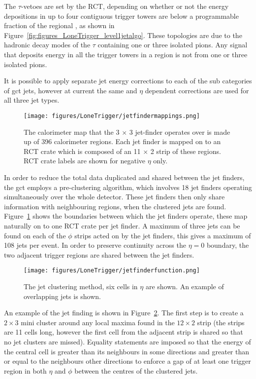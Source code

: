 The $\tau$-vetoes are set by the RCT, depending on whether or not the energy 
depositions in up to four contiguous trigger towers are below a programmable 
fraction of the regional \ET, as shown in 
Figure~\ref{fig:figures_LoneTrigger_level1jetalgo}. These topologies are due to 
the hadronic decay modes of the $\tau$ containing one or three isolated pions. 
Any signal that deposits energy in all the trigger towers in a region is not 
from one or three isolated pions.

It is possible to apply separate jet energy corrections to each of the sub 
categories of \ac{gct} jets, however at current the same \ET and $\eta$ dependent 
corrections are used for all three jet types.

\begin{figure}[ht]
  \centering    
  \texttt{[image: figures/LoneTrigger/jetfindermappings.png]}
  \caption{The calorimeter map that the 3 $\times$ 3 jet-finder operates over
   is made up of 396 calorimeter regions. Each jet finder is mapped on to an 
   RCT crate which is composed of an 11 $\times$ 2 strip of these regions. RCT
   crate labels are shown for negative $\eta$ only. }
  \label{fig:figures_LoneTrigger_jetfindermappings}
\end{figure}

In order to reduce the total data duplicated and shared between the jet finders,
the \ac{gct} employs a pre-clustering algorithm, which involves 18 jet finders 
operating simultaneously over the whole detector. These jet finders then only
share information with neighbouring regions, when the clustered jets are found.
Figure~\ref{fig:figures_LoneTrigger_jetfindermappings} shows the boundaries 
between which the jet finders operate, these map naturally on to one RCT crate 
per jet finder. A maximum of three jets can be found on each of the $\phi$ 
strips acted on by the jet finders, this gives a maximum of 108 jets per event. 
In order to preserve continuity across the $\eta = 0$ boundary, the two adjacent
trigger regions are shared between the jet finders.


\begin{figure}[ht]
  \centering
 \texttt{[image: figures/LoneTrigger/jetfinderfunction.png]}
  \caption{The \Lone jet clustering method, six cells in $\eta$ are shown. An
  example of overlapping jets is shown.\cite{ilesgct}}
  \label{fig:figures_LoneTrigger_jetfinderfunction}
\end{figure}


An example of the jet finding is shown in
Figure~\ref{fig:figures_LoneTrigger_jetfinderfunction}. The first step is to 
create a $2 \times 3$ mini cluster around any local maxima found in the $12 
\times 2$ strip (the strips are 11 cells long, however the first cell from the adjacent strip is shared so that no jet clusters are missed). Equality statements are imposed so that the energy of the 
central cell is greater than its neighbours in some directions and greater than 
or equal to the neighbours other directions to enforce a gap of at least one 
trigger region in both $\eta$ and $\phi$ between the centres of the clustered 
jets.

